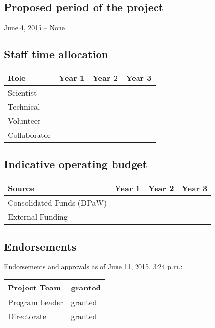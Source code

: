 \documentclass[version=last, paper=a4, DIV=18, usenames, dvipsnames]{scrartcl}
\begin{document}
\subsection*{Proposed period of the project}
June 4, 2015 -- None

\subsection*{Staff time allocation }



\begin{longtabu} to \linewidth { |  X | X | X | X | }
\hline
{}
Role & Year 1 & Year 2 & Year 3\\
\hline
\endhead



Scientist &  &  & \\



Technical &  &  & \\



Volunteer &  &  & \\



Collaborator &  &  & \\


\hline
\end{longtabu}



\subsection*{Indicative operating budget }



\begin{longtabu} to \linewidth { |  X | X | X | X | }
\hline
{}
Source & Year 1 & Year 2 & Year 3\\
\hline
\endhead



Consolidated Funds (DPaW) &  &  & \\



External Funding &  &  & \\


\hline
\end{longtabu}





\subsection*{Endorsements}
Endorsements and approvals as of June 11, 2015, 3:24 p.m.:\\
\begin{tabu} {| X | X |}
\hline

Project Team & granted\\
\hline

Program Leader & granted\\
\hline

Directorate & granted\\
\hline

\end{tabu}
\end{document}
